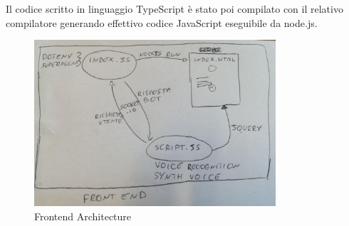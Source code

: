 Il codice scritto in linguaggio TypeScript è stato poi compilato con il relativo compilatore generando effettivo codice JavaScript eseguibile da node.js.
\begin{figure}[H]
 \centering
  \includegraphics[width=0.8\textwidth]{img/frontend.jpg}
 \caption{Frontend Architecture}
\end{figure}

